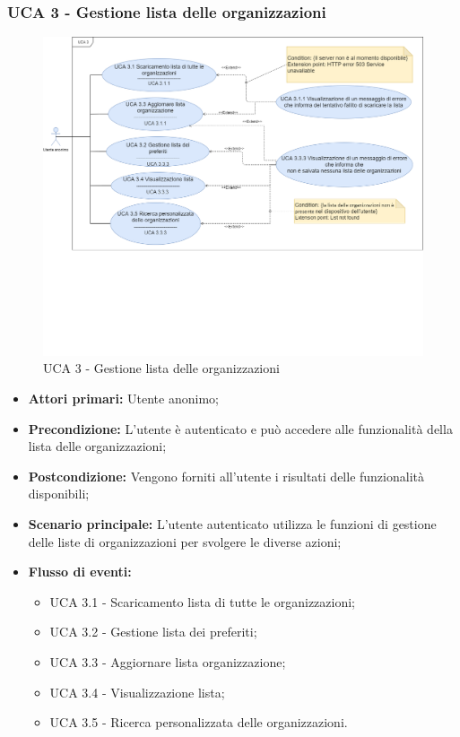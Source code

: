 \newpage


\subsubsection{UCA 3 - Gestione lista delle organizzazioni}%
\begin{figure}[h]
	\centering
	\includegraphics[scale=0.33]{sezioni/UseCase/Immagini/UCA3.png}
	\caption{UCA 3 - Gestione lista delle organizzazioni}
\end{figure}

\begin{itemize}
\item \textbf{Attori primari:} Utente anonimo;
\item \textbf{Precondizione:} L'utente è autenticato e può accedere alle funzionalità della lista delle organizzazioni;
\item \textbf{Postcondizione:} Vengono forniti all'utente i risultati delle funzionalità disponibili;
\item \textbf{Scenario principale:} L'utente autenticato utilizza le funzioni di gestione delle liste di organizzazioni per svolgere le diverse azioni;
\item \textbf{Flusso di eventi:}
	\begin{itemize}
		\item UCA 3.1 - Scaricamento lista di tutte le organizzazioni;
		\item UCA 3.2 - Gestione lista dei preferiti;
		\item UCA 3.3 - Aggiornare lista organizzazione;
		\item UCA 3.4 - Visualizzazione lista;
		\item UCA 3.5 - Ricerca personalizzata delle organizzazioni.
	\end{itemize}
\end{itemize}




